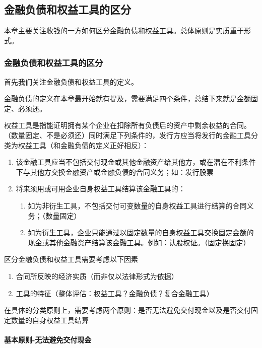 \documentclass[UTF8,12pt]{ctexart}
\numberwithin{equation}{section} %
\numberwithin{figure}{section}
\numberwithin{table}{section}
\begin{document}
	\subsection{金融负债和权益工具的区分}
	本章主要关注收钱的一方如何区分金融负债和权益工具。总体原则是实质重于形式。
	
	\subsubsection{金融负债和权益工具的区分}
	首先我们关注金融负债和权益工具的定义。
	
	金融负债的定义在本章最开始就有提及，需要满足四个条件，总结下来就是金额固定、必须还。
	

	权益工具是指能证明拥有某个企业在扣除所有负债后的资产中剩余权益的合同。（数量固定、不是必须还）同时满足下列条件的，发行方应当将发行的金融工具分类为权益工具（和金融负债的定义正好相反）：
	\begin{enumerate}
		\item 该金融工具应当不包括交付现金或其他金融资产给其他方，或在潜在不利条件下与其他方交换金融资产或金融负债的合同义务；如：发行股票
		
		\item 将来须用或可用企业自身权益工具结算该金融工具的：
		\begin{enumerate}
			\item 如为非衍生工具，不包括交付可变数量的自身权益工具进行结算的合同义务；（数量固定）
			
			\item 如为衍生工具，企业只能通过以固定数量的自身权益工具交换固定金额的现金或其他金融资产结算该金融工具。例如：认股权证。（固定换固定）
		\end{enumerate}
	\end{enumerate}

	区分金融负债和权益工具需要考虑以下因素
	\begin{enumerate}
		\item 合同所反映的经济实质（而非仅以法律形式为依据）
		
		\item 工具的特征（整体评估：权益工具？金融负债？复合金融工具）
	\end{enumerate}
	
	在具体的分类原则上，需要考虑两个原则：是否无法避免交付现金以及是否交付固定数量的自身权益工具结算
	
	\paragraph{基本原则-无法避免交付现金}
	
\end{document}
